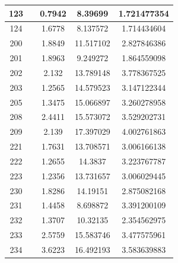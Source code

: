\begin{table}[!tp]
\begin{tabular}{|c|c|c|c|c|}
		123 & & 0.7942 &  8.39699  & 1.721477354\\ \hline
		124 & & 1.6778 &  8.137572 & 1.714434604\\ \hline
		200 & & 1.8849 & 11.517102 & 2.827846386\\ \hline
		201 & & 1.8963 &  9.249272 & 1.864559098\\ \hline
		202 & & 2.132  & 13.789148 & 3.778367525\\ \hline
		203 & & 1.2565 & 14.579523 & 3.147122344\\ \hline
		205 & & 1.3475 & 15.066897 & 3.260278958\\ \hline
		208 & & 2.4411 & 15.573072 & 3.529202731\\ \hline
		209 & & 2.139  & 17.397029 & 4.002761863\\ \hline
		221 & & 1.7631 & 13.708571 & 3.006166138\\ \hline
		222 & & 1.2655 & 14.3837   & 3.223767787\\ \hline
		223 & & 1.2356 & 13.731657 & 3.006029445\\ \hline
		230 & & 1.8286 & 14.19151  & 2.875082168\\ \hline
		231 & & 1.4458 &  8.698872 & 3.391200109\\ \hline
		232 & & 1.3707 & 10.32135  & 2.354562975\\ \hline
		233 & & 2.5759 & 15.583746 & 3.477575961\\ \hline
		234 & & 3.6223 & 16.492193 & 3.583639883\\ \hline
	\end{tabular}
\end{table}

